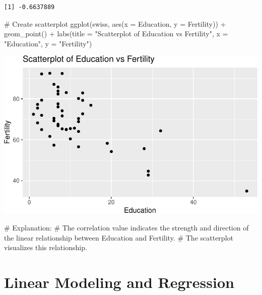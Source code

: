 \documentclass[
  letterpaper,
  DIV=11,
  numbers=noendperiod]{scrreprt}
\newenvironment{Shaded}{\begin{snugshade}}{\end{snugshade}}
\newcommand{\AttributeTok}[1]{\textcolor[rgb]{0.40,0.45,0.13}{#1}}
\newcommand{\CommentTok}[1]{\textcolor[rgb]{0.37,0.37,0.37}{#1}}
\newcommand{\FunctionTok}[1]{\textcolor[rgb]{0.28,0.35,0.67}{#1}}
\newcommand{\NormalTok}[1]{\textcolor[rgb]{0.00,0.23,0.31}{#1}}
\newcommand{\SpecialCharTok}[1]{\textcolor[rgb]{0.37,0.37,0.37}{#1}}
\newcommand{\StringTok}[1]{\textcolor[rgb]{0.13,0.47,0.30}{#1}}
\begin{document}
\begin{verbatim}
[1] -0.6637889
\end{verbatim}

\begin{Shaded}
\begin{Highlighting}[]
\CommentTok{\# Create scatterplot}
\FunctionTok{ggplot}\NormalTok{(swiss, }\FunctionTok{aes}\NormalTok{(}\AttributeTok{x =}\NormalTok{ Education, }\AttributeTok{y =}\NormalTok{ Fertility)) }\SpecialCharTok{+}
  \FunctionTok{geom\_point}\NormalTok{() }\SpecialCharTok{+}
  \FunctionTok{labs}\NormalTok{(}\AttributeTok{title =} \StringTok{"Scatterplot of Education vs Fertility"}\NormalTok{, }\AttributeTok{x =} \StringTok{"Education"}\NormalTok{, }\AttributeTok{y =} \StringTok{"Fertility"}\NormalTok{)}
\end{Highlighting}
\end{Shaded}

\includegraphics{Scatterplots_and_Correlation_files/figure-pdf/unnamed-chunk-15-1.pdf}

\begin{Shaded}
\begin{Highlighting}[]
\CommentTok{\# Explanation:}
\CommentTok{\# The correlation value indicates the strength and direction of the linear relationship between Education and Fertility.}
\CommentTok{\# The scatterplot visualizes this relationship.}
\end{Highlighting}
\end{Shaded}


\chapter*{Linear Modeling and
Regression}\label{linear-modeling-and-regression}
\end{document}

